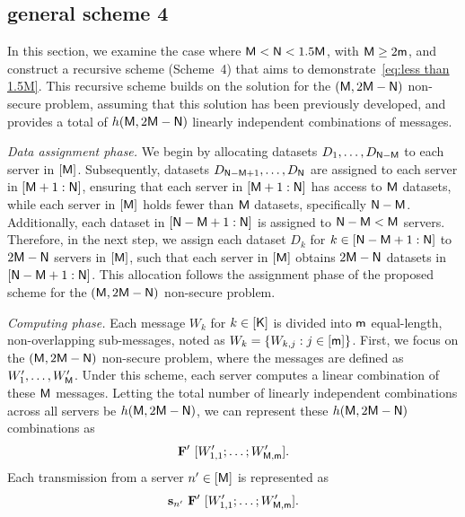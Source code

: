 \documentclass[conference,letterpaper]{IEEEtran}
\begin{document}
\subsection{general scheme 4}
\label{general scheme 4}
In this section, we examine the case where ${\sf M} < {\sf N} < 1.5 {\sf M}$, with ${\sf M} \geq 2{\sf m}$, and construct a recursive scheme (Scheme~4) that aims to demonstrate~\eqref{eq:less than 1.5M}. This recursive scheme builds on the solution for the $({\sf M}, 2{\sf M}-{\sf N})$ non-secure problem, assuming that this solution has been previously developed, and provides a total of $h({\sf M}, 2{\sf M}-{\sf N})$ linearly independent combinations of messages.

{\it Data assignment phase.} We begin by allocating datasets $D_{1}, \ldots, D_{{\sf N}-{\sf M}}$ to each server in $[{\sf M}]$. Subsequently, datasets $D_{{\sf N}-{\sf M}+1}, \ldots, D_{{\sf N}}$ are assigned to each server in $[{\sf M}+1:{\sf N}]$, ensuring that each server in $[{\sf M}+1:{\sf N}]$ has access to ${\sf M}$ datasets, while each server in $[{\sf M}]$ holds fewer than ${\sf M}$ datasets, specifically ${\sf N} - {\sf M}$. Additionally, each dataset in $[{\sf N}-{\sf M}+1 : {\sf N}]$ is assigned to ${\sf N} - {\sf M} < {\sf M}$ servers. Therefore, in the next step, we assign each dataset $D_k$ for $k \in [{\sf N} - {\sf M} + 1 : {\sf N}]$ to $2{\sf M} - {\sf N}$ servers in $[{\sf M}]$, such that each server in $[{\sf M}]$ obtains $2{\sf M} - {\sf N}$ datasets in $[{\sf N} - {\sf M} + 1 : {\sf N}]$. This allocation follows the assignment phase of the proposed scheme for the $({\sf M}, 2{\sf M}-{\sf N})$ non-secure problem.

{\it Computing phase.} Each message $W_k$ for $k \in [{\sf K}]$ is divided into ${\sf m}$ equal-length, non-overlapping sub-messages, noted as $W_k = \{W_{k,j} : j \in [{\sf m}]\}$. First, we focus on the $({\sf M}, 2{\sf M}-{\sf N})$ non-secure problem, where the messages are defined as $W^{\prime}_1, \ldots, W^{\prime}_{{\sf M}}$. Under this scheme, each server computes a linear combination of these ${\sf M}$ messages. Letting the total number of linearly independent combinations across all servers be $h({\sf M}, 2{\sf M}-{\sf N})$, we can represent these $h({\sf M}, 2{\sf M}-{\sf N})$ combinations as  
\begin{align}
{\bf F}' \  [W^{\prime}_{1,1}; \ldots; W^{\prime}_{{\sf M},{\sf m}}].\label{eq:F_1}
\end{align}
Each transmission from a server $n^{\prime} \in \left[ {\sf M} \right]$ is represented as
$$
{\bf s}_{n^{\prime}} \ {\bf F}'  \  [W^{\prime}_{1,1}; \ldots; W^{\prime}_{{\sf M},{\sf m}}].
$$
\end{document}
